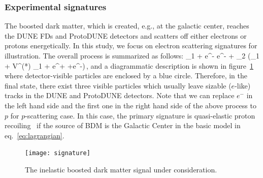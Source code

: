 \subsubsection{Experimental signatures}

The boosted dark matter, which is created, e.g., at the galactic center, reaches the DUNE FDs and ProtoDUNE detectors and scatters off either electrons or protons energetically. 
In this study, we focus on electron scattering signatures for illustration. 
The overall process is summarized as follows:
\bea 
\chi_1 + e^- \to e^- + \chi_2 (\to \chi_1 + V^{(*)} \to \chi_1 + e^+ +e^-)\,,
\eea
and a diagrammatic description is shown in figure~\ref{fig:sig} where detector-visible particles are enclosed by a blue circle. 
Therefore, in the final state, there exist three visible particles which usually leave sizable ($e$-like) tracks in the DUNE and ProtoDUNE detectors.  
Note that we can replace $e^-$ in the left hand side and the first one in the right hand side of the above process to $p$ for $p$-scattering case.
In this case, the primary signature is quasi-elastic proton recoiling~\cite{pscattering} if the source of BDM is the Galactic Center in the basic model in eq.~\eqref{eq:lagrangian}.

\begin{figure}[t]
\centering
\texttt{[image: signature]}
\caption{\label{fig:sig} The inelastic boosted dark matter signal under consideration.}
\end{figure}



